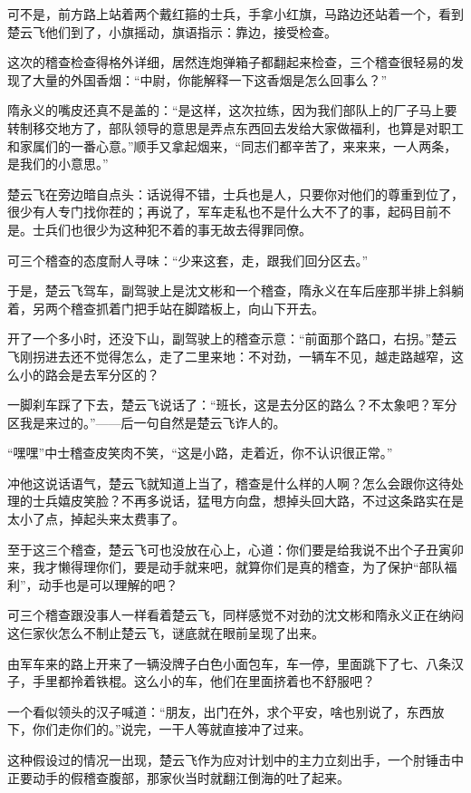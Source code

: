可不是，前方路上站着两个戴红箍的士兵，手拿小红旗，马路边还站着一个，看到楚云飞他们到了，小旗摇动，旗语指示：靠边，接受检查。

这次的稽查检查得格外详细，居然连炮弹箱子都翻起来检查，三个稽查很轻易的发现了大量的外国香烟：“中尉，你能解释一下这香烟是怎么回事么？”

隋永义的嘴皮还真不是盖的：“是这样，这次拉练，因为我们部队上的厂子马上要转制移交地方了，部队领导的意思是弄点东西回去发给大家做福利，也算是对职工和家属们的一番心意。”顺手又拿起烟来，“同志们都辛苦了，来来来，一人两条，是我们的小意思。”

楚云飞在旁边暗自点头：话说得不错，士兵也是人，只要你对他们的尊重到位了，很少有人专门找你茬的；再说了，军车走私也不是什么大不了的事，起码目前不是。士兵们也很少为这种犯不着的事无故去得罪同僚。

可三个稽查的态度耐人寻味：“少来这套，走，跟我们回分区去。”

于是，楚云飞驾车，副驾驶上是沈文彬和一个稽查，隋永义在车后座那半排上斜躺着，另两个稽查抓着门把手站在脚踏板上，向山下开去。

开了一个多小时，还没下山，副驾驶上的稽查示意：“前面那个路口，右拐。”楚云飞刚拐进去还不觉得怎么，走了二里来地：不对劲，一辆车不见，越走路越窄，这么小的路会是去军分区的？

一脚刹车踩了下去，楚云飞说话了：“班长，这是去分区的路么？不太象吧？军分区我是来过的。”——后一句自然是楚云飞诈人的。

“嘿嘿”中士稽查皮笑肉不笑，“这是小路，走着近，你不认识很正常。”

冲他这说话语气，楚云飞就知道上当了，稽查是什么样的人啊？怎么会跟你这待处理的士兵嬉皮笑脸？不再多说话，猛甩方向盘，想掉头回大路，不过这条路实在是太小了点，掉起头来太费事了。

至于这三个稽查，楚云飞可也没放在心上，心道：你们要是给我说不出个子丑寅卯来，我才懒得理你们，要是动手就来吧，就算你们是真的稽查，为了保护“部队福利”，动手也是可以理解的吧？

可三个稽查跟没事人一样看着楚云飞，同样感觉不对劲的沈文彬和隋永义正在纳闷这仨家伙怎么不制止楚云飞，谜底就在眼前呈现了出来。

由军车来的路上开来了一辆没牌子白色小面包车，车一停，里面跳下了七、八条汉子，手里都拎着铁棍。这么小的车，他们在里面挤着也不舒服吧？

一个看似领头的汉子喊道：“朋友，出门在外，求个平安，啥也别说了，东西放下，你们走你们的。”说完，一干人等就直接冲了过来。

这种假设过的情况一出现，楚云飞作为应对计划中的主力立刻出手，一个肘锤击中正要动手的假稽查腹部，那家伙当时就翻江倒海的吐了起来。


